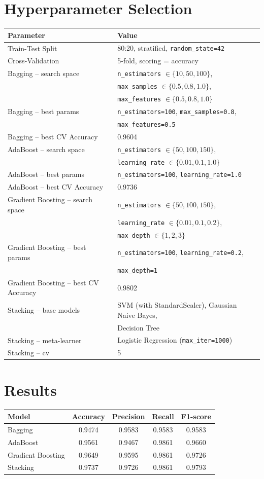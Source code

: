\documentclass[12pt,a4paper]{article}
\begin{document}
\section{Hyperparameter Selection}
\begin{tabular}{ll}
\toprule
Parameter & Value\\
\midrule
Train-Test Split & 80:20, stratified, \texttt{random\_state=42}\\
Cross-Validation & 5-fold, scoring = accuracy\\
Bagging -- search space & \texttt{n\_estimators} $\in\{10,50,100\}$,\\
& \texttt{max\_samples} $\in\{0.5,0.8,1.0\}$,\\
& \texttt{max\_features} $\in\{0.5,0.8,1.0\}$\\
Bagging -- best params & \texttt{n\_estimators=100}, \texttt{max\_samples=0.8},\\
& \texttt{max\_features=0.5}\\
Bagging -- best CV Accuracy & 0.9604\\
AdaBoost -- search space & \texttt{n\_estimators} $\in\{50,100,150\}$,\\
& \texttt{learning\_rate} $\in\{0.01,0.1,1.0\}$\\
AdaBoost -- best params & \texttt{n\_estimators=100}, \texttt{learning\_rate=1.0}\\
AdaBoost -- best CV Accuracy & 0.9736\\
Gradient Boosting -- search space & \texttt{n\_estimators} $\in\{50,100,150\}$,\\
& \texttt{learning\_rate} $\in\{0.01,0.1,0.2\}$,\\
& \texttt{max\_depth} $\in\{1,2,3\}$\\
Gradient Boosting -- best params & \texttt{n\_estimators=100}, \texttt{learning\_rate=0.2},\\
& \texttt{max\_depth=1}\\
Gradient Boosting -- best CV Accuracy & 0.9802\\
Stacking -- base models & SVM (with StandardScaler), Gaussian Naive Bayes,\\
& Decision Tree\\
Stacking -- meta-learner & Logistic Regression (\texttt{max\_iter=1000})\\
Stacking -- cv & 5\\
\bottomrule
\end{tabular}

\section{Results}
\begin{longtable}{lcccc}
\toprule
Model & Accuracy & Precision & Recall & F1-score\\
\midrule
Bagging & 0.9474 & 0.9583 & 0.9583 & 0.9583\\
AdaBoost & 0.9561 & 0.9467 & 0.9861 & 0.9660\\
Gradient Boosting & 0.9649 & 0.9595 & 0.9861 & 0.9726\\
Stacking & 0.9737 & 0.9726 & 0.9861 & 0.9793\\
\bottomrule
\end{longtable}
\end{document}
